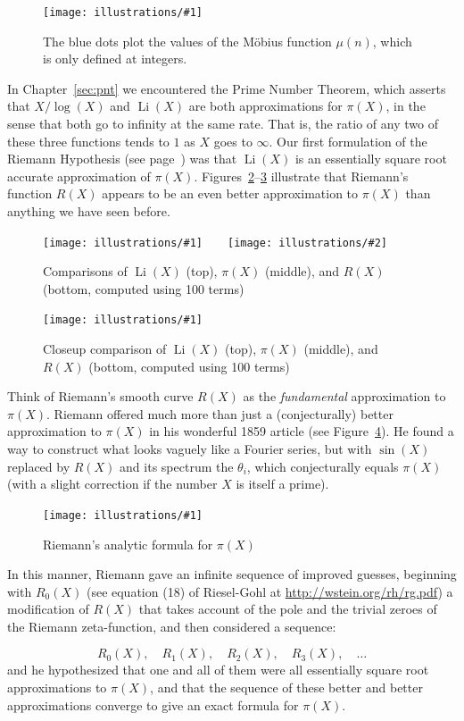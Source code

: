 \documentclass[openany]{book}
\DeclareMathOperator{\Li}{Li}
\newcommand{\ill}[3]{%
   \begin{figure}[H]%
   \vspace{-2ex}
   \centering%
   \texttt{[image: illustrations/\#1]}%
   \caption{#3}%
   \vspace{-2ex}
    \end{figure}}
\newcommand{\illtwo}[4]{%
   \begin{figure}[H]\centering%
   \texttt{[image: illustrations/\#1]}$\qquad$\texttt{[image: illustrations/\#2]}%
   \caption{#4}%
    \end{figure}}
\theoremstyle{plain}
\theoremstyle{definition}
\newcommand{\RH}{Riemann Hypothesis\index{Riemann Hypothesis}}
\begin{document}
{{\ill{moebius}{1}{The blue dots plot the values of the M\"{o}bius function\index{M\"{o}bius function} $\mu(n)$, which is only defined at integers.\label{fig:moebius}}


In Chapter~\ref{sec:pnt} we encountered the Prime Number Theorem, which
asserts that $X/\log(X)$ and $\Li(X)$ are both approximations for
$\pi(X)$, in the sense that both go to infinity at the same rate.  That is, the ratio of any two of these three functions tends to $1$ as $X$ goes to $\infty$.
Our first formulation of the \RH{} (see page~\pageref{rh:first}) was
that $\Li(X)$ is an essentially square root accurate approximation of
$\pi(X)$.  Figures~\ref{fig:guess100}--\ref{fig:guess10000} illustrate
that Riemann's function $R(X)$ appears to be an even better
approximation to $\pi(X)$ than anything we have seen before.

\illtwo{pi_riemann_gauss_100}{pi_riemann_gauss_1000}{0.47}{Comparisons of $\Li(X)$ (top), $\pi(X)$ (middle), and $R(X)$ (bottom, computed using 100 terms)\label{fig:guess100}}


\ill{pi_riemann_gauss_10000-11000}{0.8}{Closeup comparison of  $\Li(X)$ (top), $\pi(X)$ (middle), and $R(X)$ (bottom, computed using 100 terms)\label{fig:guess10000}}


Think of Riemann's smooth curve $R(X)$ as the {\em fundamental}
approximation to $\pi(X)$.
Riemann offered much more than just a (conjecturally) better
approximation to $\pi(X)$ in his wonderful 1859 article
(see Figure~\ref{fig:riemann_Rk}).
He found a way to construct what looks vaguely like a Fourier series,
but with $\sin(X)$ replaced by $R(X)$ and its spectrum the $\theta_i$, which
conjecturally  equals $\pi(X)$ (with a slight correction if the number $X$ is itself a prime).
\ill{riemann_Rk}{1}{Riemann's analytic formula for $\pi(X)$\label{fig:riemann_Rk}}
In this manner, Riemann gave an infinite sequence of improved guesses, beginning with $R_0(X)$ (see equation (18)  of Riesel-Gohl at  \url{http://wstein.org/rh/rg.pdf})  a modification of $R(X)$ that takes account of the pole and the trivial zeroes of the Riemann zeta-function, and then considered a sequence:


$$
R_0(X),\quad R_1(X), \quad R_2(X), \quad R_3(X), \quad \ldots
$$
and he hypothesized that one and all of them were all
essentially square root approximations to $\pi(X)$,
and that the sequence of these better and better approximations converge to give an exact formula
for $\pi(X)$.

}}
\end{document}
